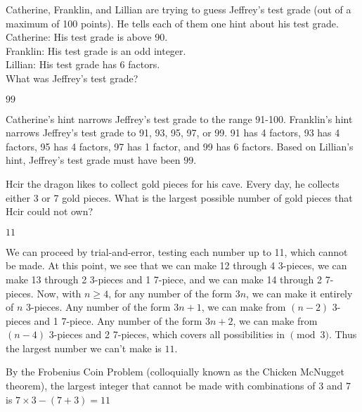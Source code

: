 \documentclass[11pt]{article}
\begin{document}
\begin{problem} %
Catherine, Franklin, and Lillian are trying to guess Jeffrey's test grade (out of a maximum of 100 points). He tells each of them one hint about his test grade.
\\Catherine: His test grade is above 90.
\\Franklin: His test grade is an odd integer.
\\Lillian: His test grade has 6 factors.
\\What was Jeffrey's test grade?
\end{problem}
\begin{answer}
$\boxed{99}$
\end{answer}
\begin{solution} Catherine's hint narrows Jeffrey's test grade to the range 91-100. Franklin's hint narrows Jeffrey's test grade to 91, 93, 95, 97, or 99. 91 has 4 factors, 93 has 4 factors, 95 has 4 factors, 97 has 1 factor, and 99 has 6 factors. Based on Lillian's hint, Jeffrey's test grade must have been $\boxed{99}$.
\end{solution}

\begin{problem} %
Hcir the dragon likes to collect gold pieces for his cave. Every day, he collects either 3 or 7 gold pieces. What is the largest possible number of gold pieces that Hcir could not own?
\end{problem}
\begin{answer}
$\boxed{11}$
\end{answer}
\begin{solutionone}
We can proceed by trial-and-error, testing each number up to 11, which cannot be made. At this point, we see that we can make 12 through 4 3-pieces, we can make 13 through 2 3-pieces and 1 7-piece, and we can make 14 through 2 7-pieces. Now, with $n\geq4$, for any number of the form $3n$, we can make it entirely of $n$ 3-pieces. Any number of the form $3n+1$, we can make from $(n-2)$ 3-pieces and 1 7-piece. Any number of the form $3n+2$, we can make from $(n-4)$ 3-pieces and 2 7-pieces, which covers all possibilities in $\pmod{3}$. Thus the largest number we can't make is $\boxed{11}$.
\end{solutionone}
\begin{solutiontwo}
By the Frobenius Coin Problem (colloquially known as the Chicken McNugget theorem), the largest integer that cannot be made with combinations of 3 and 7 is $7\times3 - (7 + 3) = \boxed{11}$
\end{solutiontwo}
\end{document}
